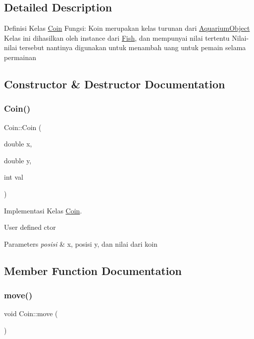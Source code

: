 \subsection{Detailed Description}
Definisi Kelas \mbox{\hyperlink{class_coin}{Coin}} Fungsi\+: Koin merupakan kelas turunan dari \mbox{\hyperlink{class_aquarium_object}{Aquarium\+Object}} Kelas ini dihasilkan oleh instance dari \mbox{\hyperlink{class_fish}{Fish}}, dan mempunyai nilai tertentu Nilai-\/nilai tersebut nantinya digunakan untuk menambah uang untuk pemain selama permainan 

\subsection{Constructor \& Destructor Documentation}
\mbox{\label{class_coin_af43cdebaaa8fa44389197213e4340f0d}} 
\subsubsection{\texorpdfstring{Coin()}{Coin()}}
{\footnotesize\ttfamily Coin\+::\+Coin (\begin{DoxyParamCaption}\item[{double}]{x,  }\item[{double}]{y,  }\item[{int}]{val }\end{DoxyParamCaption})}



Implementasi Kelas \mbox{\hyperlink{class_coin}{Coin}}. 

User defined ctor 
\begin{DoxyParams}{Parameters}
{\em posisi} & x, posisi y, dan nilai dari koin \\
\hline
\end{DoxyParams}


\subsection{Member Function Documentation}
\mbox{\label{class_coin_ab62bca5834489b9b483deaa3ca3470e9}} 
\subsubsection{\texorpdfstring{move()}{move()}}
{\footnotesize\ttfamily void Coin\+::move (\begin{DoxyParamCaption}{ }\end{DoxyParamCaption})\hspace{0.3cm}{\ttfamily [virtual]}}

